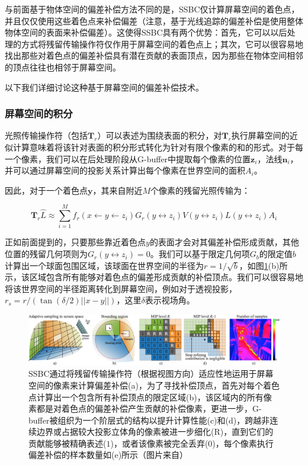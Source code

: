 与前面基于物体空间的偏差补偿方法不同的是，SSBC仅计算屏幕空间的着色点，并且仅仅使用这些着色点来补偿偏差（注意，基于光线追踪的偏差补偿是使用整体物体空间的表面来补偿偏差）。这使得SSBC具有两个优势：首先，它可以以后处理的方式将残留传输操作符仅作用于屏幕空间的着色点上；其次，它可以很容易地找出那些对着色点的偏差补偿具有潜在贡献的表面顶点，因为那些在物体空间相邻的顶点往往也相邻于屏幕空间。

以下我们详细讨论这种基于屏幕空间的偏差补偿技术。




\subsubsection{屏幕空间的积分}
光照传输操作符（包括$\mathbf{T}_r$）可以表述为围绕表面的积分，对$\mathbf{T}_r$执行屏幕空间的近似计算意味着将该针对表面的积分形式转化为针对有限个像素的和的形式。对于每一个像素，我们可以在后处理阶段从G-buffer中提取每个像素的位置$\mathbf{z}_i$，法线$\mathbf{n}_i$，并可以通过屏幕空间的投影关系计算出每个像素在世界空间的面积$A_i$。

因此，对于一个着色点$\mathbf{y}$，其来自附近$M$个像素的残留光照传输为：

\begin{equation}\label{e:ir-operator}
	\mathbf{T}_r\hat{L}\approx\sum^{M}_{i=1}f_r(x\leftarrow y\leftarrow z_i)G_r(y\leftrightarrow z_i)V(y\leftrightarrow z_i)L(y\leftrightarrow z_i)A_i
\end{equation}

正如前面提到的，只要那些靠近着色点$y$的表面才会对其偏差补偿形成贡献，其他位置的残留几何项则为$G_r(y\leftrightarrow z_i)=0$。我们可以基于限定几何项$G_b$的限定值$b$计算出一个球面包围区域，该球面在世界空间的半径为$r=1/\sqrt{b}$，如图\ref{f:ir-ssbc}(b)所示，该区域包含所有能够对着色点的偏差形成贡献的补偿顶点。我们可以很容易地将该世界空间的半径距离转化到屏幕空间，例如对于透视投影，$r_s=r/(\tan(\delta /2)||x-y||)$，这里$\delta$表示视场角。

\begin{figure}
\begin{fullwidth}	
	\includegraphics[width=1.0\thewidth]{figures/ir/ir-6-1}
	\caption{SSBC通过将残留传输操作符（根据视图方向）适应性地运用于屏幕空间的像素来计算偏差补偿(a)，为了寻找补偿顶点，首先对每个着色点计算出一个包含所有补偿顶点的限定区域(b)，该区域内的所有像素都是对着色点的偏差补偿产生贡献的补偿像素，更进一步，G-buffer被组织为一个阶层式的结构以提升计算性能(c)和(d)，跨越非连续边界或占据较大投影立体角的像素被进一步细化(R)，直到它们的贡献能够被精确表述($1$)，或者该像素被完全丢弃($0$)，每个像素执行偏差补偿的样本数量如(e)所示（图片来自\cite{a:Screen-SpaceBiasCompensationfor}）}
	\label{f:ir-ssbc}
\end{fullwidth}
\end{figure}

